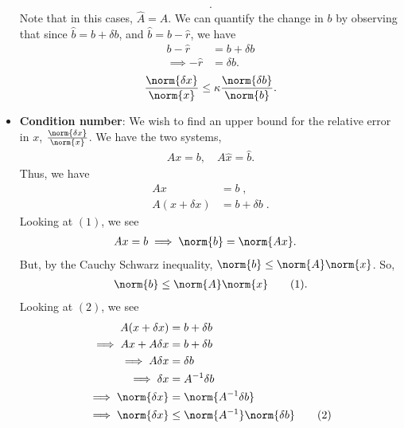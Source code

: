 \documentclass{report}
\begin{document}
\begin{itemize}
\begin{align*}
            .\end{align*}
            Note that in this cases, $\hat{A} = A$. We can quantify the change in $b$ by observing that since $\hat{b} = b + \delta b$, and $\hat{b} = b - \hat{r}$, we have
            \begin{align*}
                b - \hat{r} &= b + \delta b\\
                \implies -\hat{r} &= \delta b 
            .\end{align*}
            \begin{align*}
                \frac{\norm{\delta x}}{\norm{x}} \leq \kappa \frac{\norm{\delta  b}}{\norm{b}}
            .\end{align*}
        \item \textbf{Condition number}: We wish to find an upper bound for the relative error in $x$, $\frac{\norm{\delta  x}}{\norm{ x}} $. We have the two systems,
            \begin{align*}
                Ax = b, \quad A\hat{x} = \hat{b}
            .\end{align*}
            Thus, we have
            \begin{align*}
                Ax &= b\; \tag{1}, \\
                A(x + \delta  x) &= b + \delta  b \; \tag{2}
            .\end{align*}
            Looking at $(1)$, we see
            \begin{align*}
                Ax &= b \implies \norm{b} = \norm{Ax}
            .\end{align*}
            But, by the Cauchy Schwarz inequality, $\norm{b} \leq \norm{A}\norm{x}$. So,
            \begin{align*}
                \norm{b} \leq \norm{A}\norm{x} \tag{1}
            .\end{align*}
            Looking at $(2) $, we see
            \begin{align*}
                A(x + \delta  x) &= b + \delta  b \\
                \implies Ax + A \delta x &= b + \delta  b \\
                \implies A \delta  x &= \delta  b  \\
                \implies \delta x &= A^{-1} \delta  b  \\
                \implies \norm{\delta  x} &= \norm{A^{-1} \delta  b} \\
                \implies \norm{ \delta  x} &\leq \norm{A^{-1}} \norm{\delta  b} \tag{2}

\end{align*}
\end{itemize}
\end{document}
